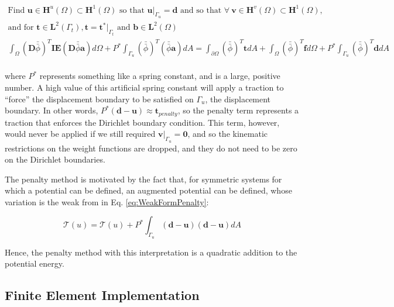 \documentclass[10pt]{article}
\begin{document}
\begin{tcolorbox}
\begin{equation}
\label{eq:WeakFormPenalty}
\begin{aligned}
\text{Find }\textbf{u}\in \textbf{H}^u(\Omega)\subset \textbf{H}^1(\Omega) \text{ so that } \textbf{u}|_{\Gamma_u}=\textbf{d} \text{ and so that }\forall\ \textbf{v} \in \textbf{H}^v(\Omega)\subset \textbf{H}^1(\Omega),\\
\text{and for }\textbf{t}\in\textbf{L}^2(\Gamma_t), \textbf{t}=\textbf{t}^{*}|_{\Gamma_t}\text{ and }\textbf{b}\in\textbf{L}^2(\Omega)\\
\int_{\Omega}(\textbf{D}\bar{\bar{\phi}})^T\textbf{IE}(\textbf{D}\bar{\bar{\phi}}\textbf{a})d\Omega +P^{*}\int_{\Gamma_u}(\bar{\bar{\phi}})^T(\bar{\bar{\phi}}\textbf{a})dA=\int_{\partial\Omega}(\bar{\bar{\phi}})^T\textbf{t}dA+\int_{\Omega}(\bar{\bar{\phi}})^T\textbf{f}d\Omega+P^{*}\int_{\Gamma_u}(\bar{\bar{\phi}})^T\textbf{d}dA\\
\end{aligned}
\end{equation}
\end{tcolorbox}

where \(P^{*}\) represents something like a spring constant, and is a large, positive number. A high value of this artificial spring constant will apply a traction to ``force'' the displacement boundary to be satisfied on \(\Gamma_u\), the displacement boundary. In other words, \(P^{*}(\textbf{d}-\textbf{u})\approx\textbf{t}_{penalty}\), so the penalty term represents a traction that enforces the Dirichlet boundary condition. This term, however, would never be applied if we still required \(\textbf{v}|_{\Gamma_u}=\textbf{0}\), and so the kinematic restrictions on the weight functions are dropped, and they do not need to be zero on the Dirichlet boundaries.

The penalty method is motivated by the fact that, for symmetric systems for which a potential can be defined, an augmented potential can be defined, whose variation is the weak from in Eq. \eqref{eq:WeakFormPenalty}:

\begin{equation}
\mathscr{T}(u)=\mathscr{T}(u)+P^{*}\int_{\Gamma_u}(\textbf{d}-\textbf{u})(\textbf{d}-\textbf{u})dA
\end{equation}

Hence, the penalty method with this interpretation is a quadratic addition to the potential energy. 

\subsection{Finite Element Implementation}
\label{sec:FEElement}
\end{document}
